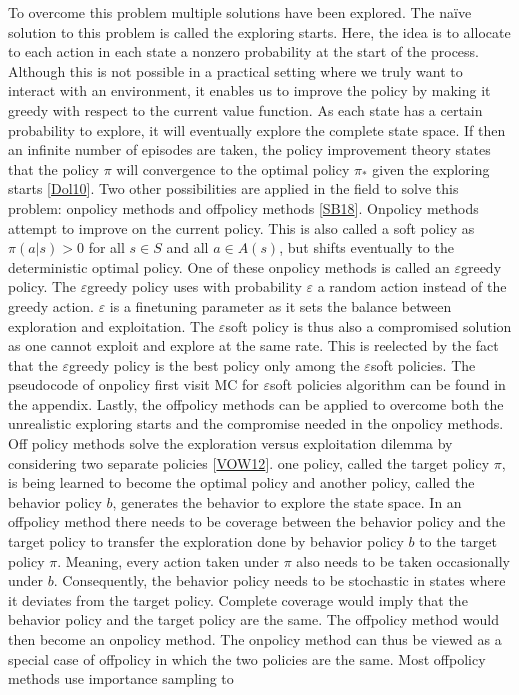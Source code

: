 \documentclass[letterpaper,10pt,english]{jupyterBook}
\begin{document}
\sphinxAtStartPar
To overcome this problem multiple solutions have been explored. The naïve solution to this problem is called the exploring starts. Here, the idea is to allocate to each action in each state a nonzero probability at the start of the process. Although this is not possible in a practical setting where we truly want to interact with an environment, it enables us to improve the policy by making it greedy with respect to the current value function. As each state has a certain probability to explore, it will eventually explore the complete state space. If then an infinite number of episodes are taken, the policy improvement theory states that the policy \(\pi\) will convergence to the optimal policy \(\pi_*\) given the exploring starts {[}\hyperlink{cite.Discussion:id61}{Dol10}{]}. Two other possibilities are applied in the field to solve this problem: on\sphinxhyphen{}policy methods and off\sphinxhyphen{}policy methods {[}\hyperlink{cite.Discussion:id70}{SB18}{]}. On\sphinxhyphen{}policy methods attempt to improve on the current policy. This is also called a soft policy as \(\pi(a|s) > 0\) for all \(s \in S\) and all \( a \in A(s)\), but shifts eventually to the deterministic optimal policy. One of these on\sphinxhyphen{}policy methods is called an \(\varepsilon\)\sphinxhyphen{}greedy policy. The \(\varepsilon\)\sphinxhyphen{}greedy policy uses with probability \(\varepsilon\) a random action instead of the greedy action. \(\varepsilon\) is a fine\sphinxhyphen{}tuning parameter as it sets the balance between exploration and exploitation. The \(\varepsilon\)\sphinxhyphen{}soft policy is thus also a compromised solution as one cannot exploit and explore at the same rate. This is reelected by the fact that the \(\varepsilon\)\sphinxhyphen{}greedy policy is the best policy only among the \(\varepsilon\)\sphinxhyphen{}soft policies. The pseudocode of on\sphinxhyphen{}policy first visit MC for \(\varepsilon\)\sphinxhyphen{}soft policies algorithm can be found in the appendix. Lastly, the off\sphinxhyphen{}policy methods can be applied to overcome both the unrealistic exploring starts and the compromise needed in the on\sphinxhyphen{}policy methods. Off policy methods solve the exploration versus exploitation dilemma by considering two separate policies {[}\hyperlink{cite.Discussion:id42}{VOW12}{]}. one policy, called the target policy \(\pi\), is being learned to become the optimal policy and another policy, called the behavior policy \(b\), generates the behavior to explore the state space. In an off\sphinxhyphen{}policy method there needs to be coverage between the behavior policy and the target policy to transfer the exploration done by behavior policy \(b\) to the target policy \(\pi\). Meaning, every action taken under \(\pi\) also needs to be taken occasionally under \(b\). Consequently, the behavior policy needs to be stochastic in states where it deviates from the target policy. Complete coverage would imply that the behavior policy and the target policy are the same. The off\sphinxhyphen{}policy method would then become an on\sphinxhyphen{}policy method. The on\sphinxhyphen{}policy method can thus be viewed as a special case of off\sphinxhyphen{}policy in which the two policies are the same. Most off\sphinxhyphen{}policy methods use importance sampling to 
\end{document}
